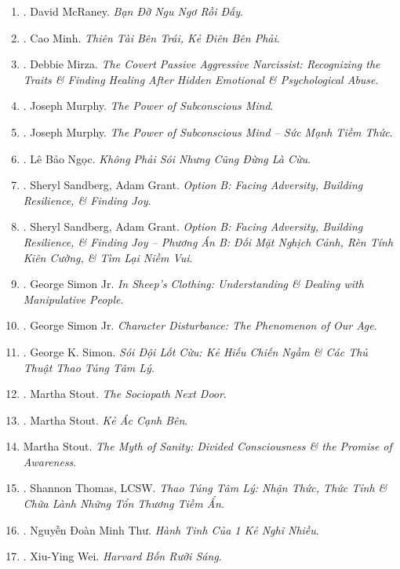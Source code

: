 \documentclass{article}
\begin{document}
\begin{enumerate}
	\item \cite{McRaney2022b}. David McRaney. \textit{Bạn Đỡ Ngu Ngơ Rồi Đấy}.\hfill{}
	\item \cite{Minh2022}. Cao Minh. \textit{Thiên Tài Bên Trái, Kẻ Điên Bên Phải}.\hfill{}
	\item \cite{Mirza2017}. Debbie Mirza. \textit{The Covert Passive Aggressive Narcissist: Recognizing the Traits \& Finding Healing After Hidden Emotional \& Psychological Abuse}.\hfill{}
	\item \cite{Murphy2011}. Joseph Murphy. \textit{The Power of Subconscious Mind}.\hfill{\sf[downloaded]}
	\item \cite{Murphy2021}. Joseph Murphy. \textit{The Power of Subconscious Mind -- Sức Mạnh Tiềm Thức}.\hfill{}
	\item \cite{Ngoc2022}. Lê Bảo Ngọc. \textit{Không Phải Sói Nhưng Cũng Đừng Là Cừu}.\hfill{}
	\item \cite{Sandberg_Grant2017}. Sheryl Sandberg, Adam Grant. \textit{Option B: Facing Adversity, Building Resilience, \& Finding Joy}.\hfill{\sf[downloaded]}
	\item \cite{Sandberg_Grant2019}. Sheryl Sandberg, Adam Grant. \textit{Option B: Facing Adversity, Building Resilience, \& Finding Joy -- Phương Án B: Đối Mặt Nghịch Cảnh, Rèn Tính Kiên Cường, \& Tìm Lại Niềm Vui}.\hfill{}
	\item \cite{Simon2010}. George Simon Jr. \textit{In Sheep's Clothing: Understanding \& Dealing with Manipulative People}.\hfill{}
	\item \cite{Simon2011}. George Simon Jr. \textit{Character Disturbance: The Phenomenon of Our Age}.\hfill{}
	\item \cite{Simon2022}. George K. Simon. \textit{Sói Đội Lốt Cừu: Kẻ Hiếu Chiến Ngầm \& Các Thủ Thuật Thao Túng Tâm Lý}.\\\mbox{}\hfill{}
	\item \cite{Stout2006}. Martha Stout. \textit{The Sociopath Next Door}.\hfill{\sf[downloaded]}
	\item \cite{Stout2019}. Martha Stout. \textit{Kẻ Ác Cạnh Bên}.\hfill{}	
	\item Martha Stout. \textit{The Myth of Sanity: Divided Consciousness \& the Promise of Awareness}.	
	\item \cite{Thomas2021}. Shannon Thomas, LCSW. \textit{Thao Túng Tâm Lý: Nhận Thức, Thức Tỉnh \& Chữa Lành Những Tổn Thương Tiềm Ẩn}.\hfill{}
	\item \cite{Thu2022}. Nguyễn Đoàn Minh Thư. \textit{Hành Tinh Của 1  Kẻ Nghĩ Nhiều}.\hfill{}
	\item \cite{Wei2022}. Xiu-Ying Wei. \textit{Harvard Bốn Rưỡi Sáng}.\hfill{}
\end{enumerate}
\end{document}
